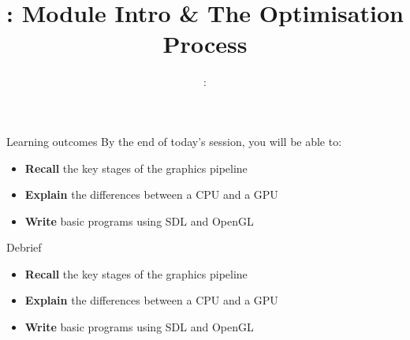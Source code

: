 \usepackage{../../beamerthemeFalmouthGamesAcademy}
\usepackage{multimedia}
\graphicspath{ {../../} }


\usepackage[normalem]{ulem}
\usepackage{wasysym}

\usepackage{pdfpages}

\usetikzlibrary{arrows,automata}




\title{\sessionnumber: Module Intro \& The Optimisation Process}
\subtitle{\modulecode: \moduletitle}

\frame{\titlepage} 

\begin{frame}{Learning outcomes}
	By the end of today's session, you will be able to:
	\begin{itemize}
		\item \textbf{Recall} the key stages of the graphics pipeline
		\item \textbf{Explain} the differences between a CPU and a GPU
		\item \textbf{Write} basic programs using SDL and OpenGL
	\end{itemize}
\end{frame}








\begin{frame}{Debrief}
	\begin{itemize}
		\item \textbf{Recall} the key stages of the graphics pipeline
		\item \textbf{Explain} the differences between a CPU and a GPU
		\item \textbf{Write} basic programs using SDL and OpenGL
	\end{itemize}
\end{frame}


